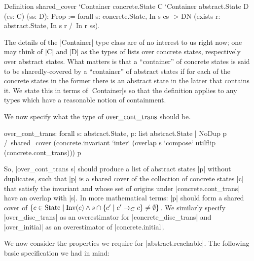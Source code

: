 \documentclass[runningheads]{llncs}
\newcommand{\State}{{\rm State}}
\newcommand{\Inv}{{\rm Inv}}
\newcommand{\contrans}{\rightarrow_C}
\newcommand{\overcontrans}{{\rm over\_cont\_trans}}
\begin{document}
\begin{code}
  Definition shared_cover
    `{Container concrete.State C} `{Container abstract.State D}
      (cs: C) (ss: D): Prop :=
        forall s: concrete.State, In s cs -> DN (exists r: abstract.State, In s r /\ In r ss).
\end{code}

The details of the |Container| type class are of no interest to us
right now; one may think of |C| and |D| as the types of lists over
concrete states, respectively over abstract states.  What matters is
that a ``container'' of concrete states is said to be sharedly-covered
by a ``container'' of abstract states if for each of the concrete
states in the former there is an abstract state in the latter that
contains it.
We state this in
terms of |Container|s so that the definition applies to any types
which have a reasonable notion of containment.

We now specify what the type of $\overcontrans$ should be.
\begin{code}
over_cont_trans: forall s: abstract.State,
  { p: list abstract.State | NoDup p /\ shared_cover
    (concrete.invariant `inter` (overlap s `compose` utilflip (concrete.cont_trans))) p }
\end{code}
So, |over_cont_trans s| should produce a list of abstract states |p|
without duplicates,
such that |p| is a shared cover of the collection
of concrete states |c| that satisfy the invariant and whose set of
origins under |concrete.cont_trans| have an overlap with |s|. In more
mathematical terms: |p| should form a shared cover of $\{ c \in \State
\mid \Inv(c) \wedge s\cap \{c' \mid c' \contrans c\} \neq \emptyset\}$.
We similarly specify |over_disc_trans| as an overestimator for
|concrete_disc_trans| and |over_initial| as an overestimator of
|concrete.initial|. 

We now consider the properties we require for |abstract.reachable|. The following basic specification we had in mind:
\end{document}
